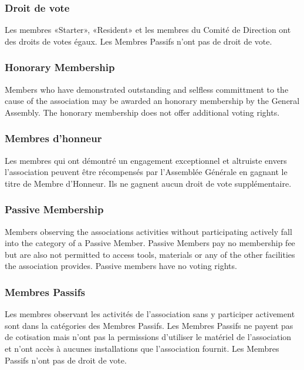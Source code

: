 \documentclass[12pt,a4paper,oneside]{article}
\newcounter{art}
\newcommand{\english}{    \switchcolumn[0]\noindent}
\newcommand{\french}{    \switchcolumn[1]\noindent}
\begin{document}
\begin{paracol}{2}
	\subsubsection{Droit de vote}
	Les membres «Starter», «Resident» et les membres du Comité de Direction ont des droits de votes égaux. Les Membres Passifs n'ont pas de droit de vote.


\english
	\subsubsection{Honorary Membership}
	Members who have demonstrated outstanding and selfless committment to the cause of the association may be awarded an honorary membership by the General Assembly. The honorary membership does not offer additional voting rights.
\french
	\subsubsection{Membres d'honneur}
	Les membres qui ont démontré un engagement exceptionnel et altruiste envers l’association peuvent être récompensés par l’Assemblée Générale en gagnant le titre de Membre d’Honneur. Ils ne gagnent aucun droit de vote supplémentaire.



\english
	\subsubsection{Passive Membership}
	Members observing the associations activities without participating actively fall into the category of a Passive Member. Passive Members pay no membership fee but are also not permitted to access tools, materials or any of the other facilities the association provides. Passive members have no voting rights.

\french
	\subsubsection{Membres Passifs}
	Les membres observant les activités de l'association sans y participer activement sont dans la catégories des Membres Passifs. Les Membres Passifs ne payent pas de cotisation mais n'ont pas la permissions d'utiliser le matériel de l'association et n'ont accès à aucunes installations que l'association fournit. Les Membres Passifs n'ont pas de droit de vote.




\end{paracol}
\end{document}
